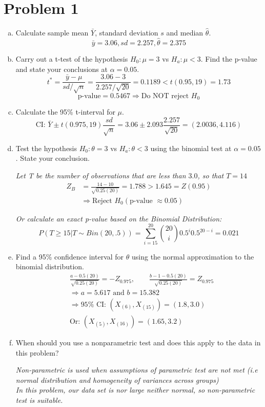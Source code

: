 \documentclass[12pt]{article}
\begin{document}
\section*{Problem 1}
\begin{enumerate}[(a)]
\item Calculate sample mean $\bar Y$, standard deviation $s$ and median $\hat\theta$.
\[ \bar{y}=3.06, sd=2.257, \hat{\theta}=2.375 \]

\item Carry out a t-test of the hypothesis $H_0: \mu=3$ vs $H_a: \mu<3$.
Find the p-value and state your conclusions at $\alpha=0.05$.
\[ t^*=\frac{\bar{y}-\mu}{sd/\sqrt{n}}=\frac{3.06-3}{2.257/\sqrt{20}}=0.1189 <t(0.95,19)=1.73 \]
\[ \text{p-value} = 0.5467 \Rightarrow \text{Do NOT reject } H_0 \] 

\item Calculate the 95\% t-interval for $\mu$.
\[ \text{CI: } \bar{Y} \pm t(0.975,19) \frac{sd}{\sqrt{n}} = 3.06 \pm 2.093 \frac{2.257}{\sqrt{20}} = (2.0036,4.116) \]

\item Test the hypothesis $H_0: \theta=3$ vs $H_a:\theta<3$ using the binomial test at
$\alpha=0.05$. State your conclusion.

\emph{Let T be the number of observations that are less than $3.0$, so that $T = 14$}
\begin{align*}
Z_B &= \frac{14-10}{\sqrt{0.25(20)}} = 1.788 > 1.645 = Z(0.95) \\
&\Rightarrow \text{Reject } H_0 (\text{p-value } \approx 0.05)
\end{align*}

\emph{Or calculate an exact p-value based on the Binomial Distribution: }
\[ P \left. \left(T \geq 15 \right| T \sim Bin(20, .5) \right) = \sum_{i=15}^{20} \binom{20}{i}0.5^i0.5^{20-i} = 0.021\]

\item Find a 95\% confidence interval for $\theta$ using the normal approximation
to the binomial distribution.
\begin{align*}
& \frac{a-0.5(20)}{\sqrt{0.25(20)}}=-Z_{0.975}, \qquad \frac{b-1-0.5(20)}{\sqrt{0.25(20)}}=Z_{0.975} \\
& \Rightarrow a = 5.617 \text{ and } b = 15.382 \\
& \Rightarrow 95\% \text{ CI: } (X_{(6)}, X_{(15)})=(1.8, 3.0) \tag*{(With the common rounding method)}\\
& \text{Or: } (X_{(5)}, X_{(16)})=(1.65, 3.2) \tag*{(With floor lower bound the ceiling upper bound)}
\end{align*}

\item When should you use a nonparametric test and does this apply to the data in this problem?

\emph{Non-parametric is used when assumptions of parametric test are not met (i.e normal distribution and homogeneity of variances across groups) \\
In this problem, our data set is nor large neither normal, so non-parametric test is suitable.}
\end{enumerate}
\end{document}
